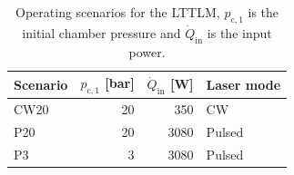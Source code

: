         \begin{table}[h]
            \centering
            \caption[Operating scenarios for the LTTLM]{Operating scenarios for the LTTLM, $p_{\mathrm{c,}1}$ is the initial chamber pressure and $\dot{Q}_\mathrm{in}$ is the input power.}
            \label{tab:thruster_scenarios}
            \begin{tabular}{@{}lrrl@{}}
                \toprule
                Scenario    & $p_{\mathrm{c,}1}$ [\unit{bar}]  & $\dot{Q}_\mathrm{in}$ [W] & Laser mode \\
                \midrule
                CW20    & 20    &  350  & CW \\
                P20     & 20    & 3080  & Pulsed \\
                P3      &  3    & 3080  & Pulsed \\
                \bottomrule
            \end{tabular}
        \end{table}

